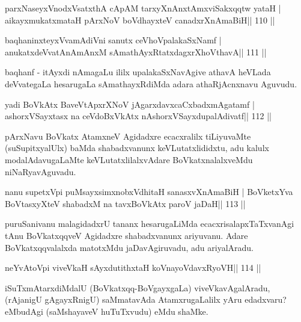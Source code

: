 \begin{shl}
parxNaseyxVnodxVsatxthA cApAM tarxyXnAnxtAmxviSakxqqtw yataH |
aikayxmukatxmataH pArxNoV boVdhayxteV canadxrXnAmaBiH\hfill || 110 ||
\end{shl}

\begin{shl}
baqhaninxteyxVvamAdiVni sanutx ceVhoVpalakaSxNamf |
anukatxdeVvatAnAmAnxM sAmathAyxRtatxdagxrXhoV\s thavA\hfill || 111 ||
\end{shl}

\begin{artha}
baqhanf - itAyxdi nAmagaLu ililx upalakaSxNavAgive athavA heVLada deVvategaLa hesarugaLa sAmathayxRdiMda adara athaRjAcnxnavu Aguvudu.
\end{artha}

\begin{shl}
yadi BoVkAtx BaveVtApxrXNoV jAgarxdavxcaCxbadxmAgatamf |
ashorxVSayxtasx na ceVdoBxVkAtx nAshorxVSayxdupalAdivatf\hfill || 112 ||
\end{shl}

\begin{artha}
pArxNavu BoVkatx AtamxneV Agidadxre ecacxralilx tiLiyuvaMte (suSupitxyalUlx) baMda shabadxvanunx keVLutatxlididxtu, adu kalulx modalAdavugaLaMte keVLutatxlilalxvAdare BoVkatxnalalxveMdu niNaRyavAguvadu.
\end{artha}


\begin{shl}
nanu supetxV\s pi puMsayxsimxnobxVdhitaH sanasxvXnAmaBiH |
BoVketxYva BoVtasxyXteV shabadxM na tavxBoVkAtx paroV jaDaH\hfill || 113 ||
\end{shl}

\begin{artha}
puruSanivanu malagidadxrU tananx hesarugaLiMda ecacxrisalapxTaTxvanAgi tAnu BoVkatxqqveV Agidadxre shabadxvanunx ariyuvanu. Adare BoVkatxqqvalalxda matotxMdu jaDavAgiruvadu, adu ariyalAradu.
\end{artha}

\begin{shl}
neYvAtoV\s pi viveVkaH sAyxdutithxtaH koV\s nayoVdavxRyoVH\hfill || 114 ||
\end{shl}

\begin{artha}
iSuTxmAtarxdiMdalU (BoVkatxqq-BoVgayxgaLa) viveVkavAgalAradu, (rAjanigU 
gAgayxRnigU) saMmatavAda AtamxrugaLalilx yAru edadxvaru? eMbudAgi (saMshayaveV huTuTxvudu) eMdu shaMke.
\end{artha}


